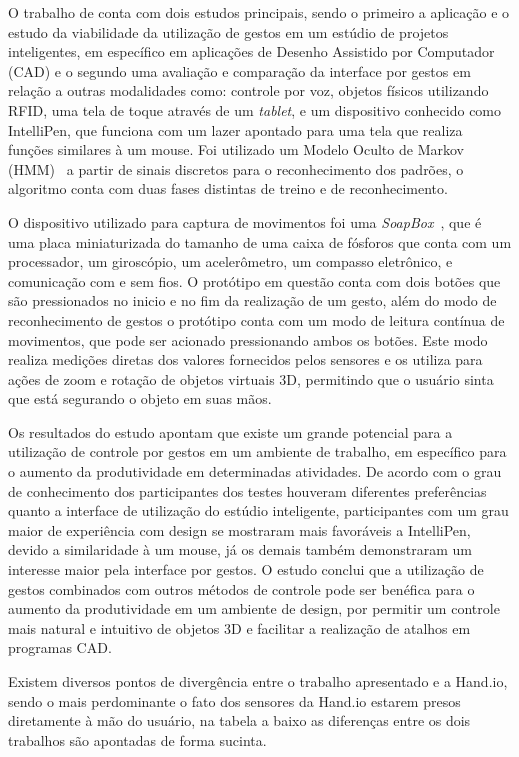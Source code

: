 O trabalho de  conta com dois estudos principais, sendo o primeiro a aplicação e o estudo da viabilidade da utilização de gestos em um estúdio de projetos inteligentes, em específico em aplicações de Desenho Assistido por Computador (CAD) e o segundo uma avaliação e comparação da interface por gestos em relação a outras modalidades como: controle por voz, objetos físicos utilizando RFID, uma tela de toque através de um \textit{tablet}, e um dispositivo conhecido como IntelliPen, que funciona com um lazer apontado para uma tela que realiza funções similares à um mouse. Foi utilizado um Modelo Oculto de Markov (HMM)~\cite{hmm:1989} a partir de sinais discretos para o reconhecimento dos padrões, o algoritmo conta com duas fases distintas de treino e de reconhecimento.


O dispositivo utilizado para captura de movimentos foi uma \textit{SoapBox}~\cite{soapbox:2002}, que é uma placa miniaturizada do tamanho de uma caixa de fósforos que conta com um processador, um giroscópio, um acelerômetro, um compasso eletrônico, e comunicação com e sem fios. O protótipo em questão conta com dois botões que são pressionados no inicio e no fim da realização de um gesto, além do modo de reconhecimento de gestos o protótipo conta com um modo de leitura contínua de movimentos, que pode ser acionado pressionando ambos os botões. Este modo realiza medições diretas dos valores fornecidos pelos sensores e os utiliza para ações de zoom e rotação de objetos virtuais 3D, permitindo que o usuário sinta que está segurando o objeto em suas mãos.

Os resultados do estudo apontam que existe um grande potencial para a utilização de controle por gestos em um ambiente de trabalho, em específico para o aumento da produtividade em determinadas atividades. De acordo com o grau de conhecimento dos participantes dos testes houveram diferentes preferências quanto a interface de utilização do estúdio inteligente, participantes com um grau maior de experiência com design se mostraram mais favoráveis a IntelliPen, devido a similaridade à um mouse, já os demais também demonstraram um interesse maior pela interface por gestos. 
% 
O estudo conclui que a utilização de gestos combinados com outros métodos de controle pode ser benéfica para o aumento da produtividade em um ambiente de design, por permitir um controle mais natural e intuitivo de objetos 3D e facilitar a realização de atalhos em programas CAD.

Existem diversos pontos de divergência entre o trabalho apresentado e a Hand.io, sendo o mais perdominante o fato dos sensores da Hand.io estarem presos diretamente à mão do usuário, na tabela a baixo as diferenças entre os dois trabalhos são apontadas de forma sucinta.

